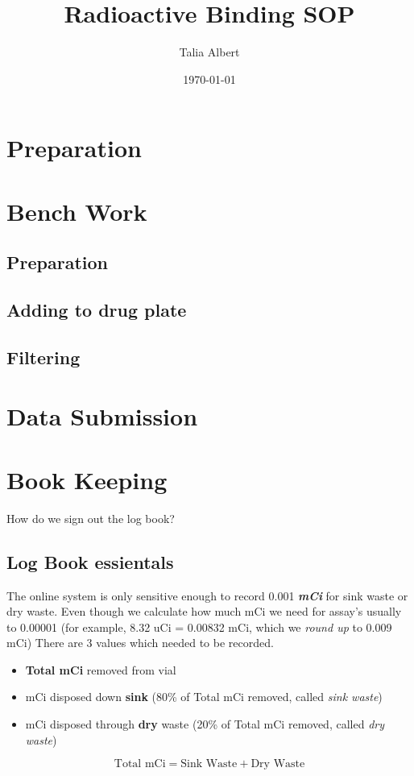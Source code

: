 \documentclass[12pt, letterpaper]{article}
\title{Radioactive Binding SOP}
\author{Talia Albert}
\date{\today}
\begin{document}
\maketitle
\tableofcontents

\section{Preparation}

\section{Bench Work}
\subsection{Preparation}
\subsection{Adding to drug plate}
\subsection{Filtering}

\section{Data Submission}

\section{Book Keeping}
How do we sign out the log book?

\subsection{Log Book essientals}
The online system is only sensitive enough to record 0.001 \textbf{\emph{mCi}} for sink waste or dry waste. Even though we calculate how much mCi we need for assay's usually to 0.00001 (for example, 8.32 uCi = 0.00832 mCi, which we \emph{round up} to 0.009 mCi) There are 3 values which needed to be recorded.
\begin{itemize}
    \item \textbf{Total mCi} removed from vial
    \item mCi disposed down \textbf{sink} (80\% of Total mCi removed, called \emph{sink waste})
    \item mCi disposed through \textbf{dry} waste (20\% of Total mCi removed, called \emph{dry waste})
\end{itemize}
\[ \text{Total mCi} = \text{Sink Waste} + \text{Dry Waste} \]
\end{document}
